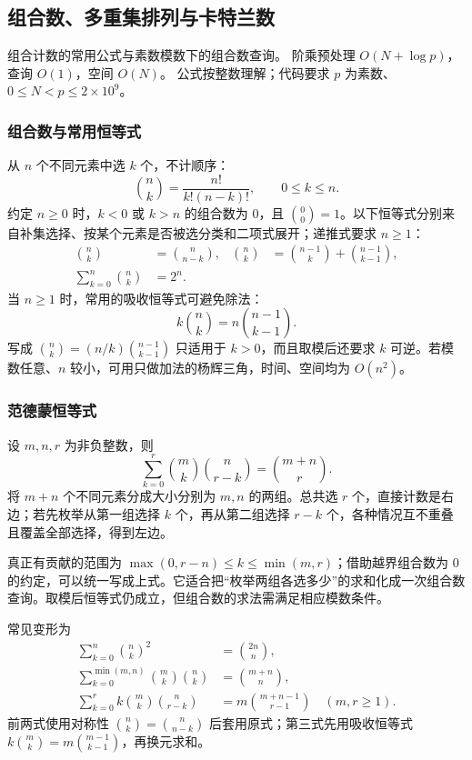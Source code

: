 \subsection{组合数、多重集排列与卡特兰数}
\label{algo:comb}
\AlgorithmInfo
    {组合计数的常用公式与素数模数下的组合数查询。}
    {阶乘预处理 $O(N+\log p)$，查询 $O(1)$，空间 $O(N)$。}
    {公式按整数理解；代码要求 $p$ 为素数、$0\leq N<p\leq2\times10^9$。}

\subsubsection*{组合数与常用恒等式}
从 $n$ 个不同元素中选 $k$ 个，不计顺序：
\[
    \binom nk=\frac{n!}{k!(n-k)!},\qquad 0\leq k\leq n.
\]
约定 $n\geq0$ 时，$k<0$ 或 $k>n$ 的组合数为 $0$，且 $\binom00=1$。以下恒等式分别来自补集选择、按某个元素是否被选分类和二项式展开；递推式要求 $n\geq1$：
\begin{align*}
    \binom nk&=\binom n{n-k},&
    \binom nk&=\binom{n-1}k+\binom{n-1}{k-1},\\
    \sum_{k=0}^n\binom nk&=2^n.
\end{align*}
当 $n\geq1$ 时，常用的吸收恒等式可避免除法：
\[
    k\binom nk=n\binom{n-1}{k-1}.
\]
写成 $\binom nk=(n/k)\binom{n-1}{k-1}$ 只适用于 $k>0$，而且取模后还要求 $k$ 可逆。若模数任意、$n$ 较小，可用只做加法的杨辉三角，时间、空间均为 $O(n^2)$。

\subsubsection*{范德蒙恒等式}
设 $m,n,r$ 为非负整数，则
\[
    \sum_{k=0}^r\binom mk\binom n{r-k}=\binom{m+n}r.
\]
将 $m+n$ 个不同元素分成大小分别为 $m,n$ 的两组。总共选 $r$ 个，直接计数是右边；若先枚举从第一组选择 $k$ 个，再从第二组选择 $r-k$ 个，各种情况互不重叠且覆盖全部选择，得到左边。

真正有贡献的范围为 $\max(0,r-n)\leq k\leq\min(m,r)$；借助越界组合数为 $0$ 的约定，可以统一写成上式。它适合把“枚举两组各选多少”的求和化成一次组合数查询。取模后恒等式仍成立，但组合数的求法需满足相应模数条件。

常见变形为
\begin{align*}
    \sum_{k=0}^n\binom nk^2&=\binom{2n}n,\\
    \sum_{k=0}^{\min(m,n)}\binom mk\binom nk&=\binom{m+n}n,\\
    \sum_{k=0}^r k\binom mk\binom n{r-k}
        &=m\binom{m+n-1}{r-1}\quad(m,r\geq1).
\end{align*}
前两式使用对称性 $\binom nk=\binom n{n-k}$ 后套用原式；第三式先用吸收恒等式 $k\binom mk=m\binom{m-1}{k-1}$，再换元求和。

